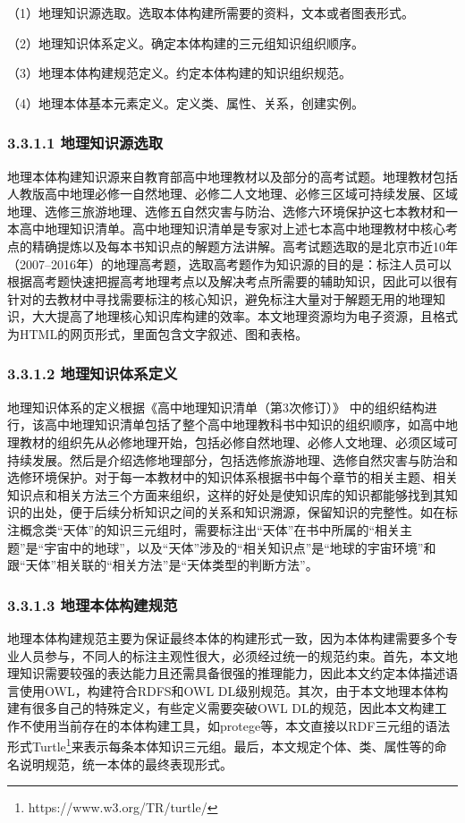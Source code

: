 （1）地理知识源选取。选取本体构建所需要的资料，文本或者图表形式。

（2）地理知识体系定义。确定本体构建的三元组知识组织顺序。

（3）地理本体构建规范定义。约定本体构建的知识组织规范。

（4）地理本体基本元素定义。定义类、属性、关系，创建实例。

\subsubsection{3.3.1.1 地理知识源选取}
地理本体构建知识源来自教育部高中地理教材以及部分的高考试题。地理教材包括人教版高中地理必修一自然地理、必修二人文地理、必修三区域可持续发展、区域地理、选修三旅游地理、选修五自然灾害与防治、选修六环境保护这七本教材和一本高中地理知识清单。高中地理知识清单是专家对上述七本高中地理教材中核心考点的精确提炼以及每本书知识点的解题方法讲解。高考试题选取的是北京市近10年（2007--2016年）的地理高考题，选取高考题作为知识源的目的是：标注人员可以根据高考题快速把握高考地理考点以及解决考点所需要的辅助知识，因此可以很有针对的去教材中寻找需要标注的核心知识，避免标注大量对于解题无用的地理知识，大大提高了地理核心知识库构建的效率。本文地理资源均为电子资源，且格式为HTML的网页形式，里面包含文字叙述、图和表格。

\subsubsection{3.3.1.2 地理知识体系定义}
地理知识体系的定义根据《高中地理知识清单（第3次修订）》
中的组织结构进行，该高中地理知识清单包括了整个高中地理教科书中知识的组织顺序，如高中地理教材的组织先从必修地理开始，包括必修自然地理、必修人文地理、必须区域可持续发展。然后是介绍选修地理部分，包括选修旅游地理、选修自然灾害与防治和选修环境保护。对于每一本教材中的知识体系根据书中每个章节的相关主题、相关知识点和相关方法三个方面来组织，这样的好处是使知识库的知识都能够找到其知识的出处，便于后续分析知识之间的关系和知识溯源，保留知识的完整性。如在标注概念类“天体”的知识三元组时，需要标注出“天体”在书中所属的“相关主题”是“宇宙中的地球”，以及“天体”涉及的“相关知识点”是“地球的宇宙环境”和跟“天体”相关联的“相关方法”是“天体类型的判断方法”。

\subsubsection{3.3.1.3 地理本体构建规范}
地理本体构建规范主要为保证最终本体的构建形式一致，因为本体构建需要多个专业人员参与，不同人的标注主观性很大，必须经过统一的规范约束。首先，本文地理知识需要较强的表达能力且还需具备很强的推理能力，因此本文约定本体描述语言使用OWL，构建符合RDFS和OWL DL级别规范。其次，由于本文地理本体构建有很多自己的特殊定义，有些定义需要突破OWL DL的规范，因此本文构建工作不使用当前存在的本体构建工具，如protege等，本文直接以RDF三元组的语法形式Turtle\footnote{https://www.w3.org/TR/turtle/}来表示每条本体知识三元组。最后，本文规定个体、类、属性等的命名说明规范，统一本体的最终表现形式。

